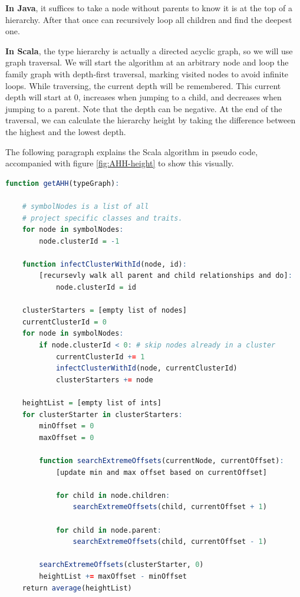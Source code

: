 \documentclass[onecolumn]{article}
\begin{document}
\textbf{In Java}, it suffices to take a node without parents to know it is at the top of a hierarchy. After that once can recursively loop all children and find the deepest one.

\textbf{In Scala}, the type hierarchy is actually a directed acyclic graph, so we will use graph traversal. We will start the algorithm at an arbitrary node and loop the family graph with depth-first traversal, marking visited nodes to avoid infinite loops. While traversing, the current depth will be remembered. This current depth will start at 0, increases when jumping to a child, and decreases when jumping to a parent. Note that the depth can be negative. At the end of the traversal, we can calculate the hierarchy height by taking the difference between the highest and the lowest depth. 

The following paragraph explains the Scala algorithm in pseudo code, accompanied with figure \ref{fig:AHH-height} to show this visually.

\begin{lstlisting}[language=R]
function getAHH(typeGraph):

    # symbolNodes is a list of all 
    # project specific classes and traits.
    for node in symbolNodes: 
        node.clusterId = -1

    function infectClusterWithId(node, id):
        [recursevly walk all parent and child relationships and do]:
            node.clusterId = id

    clusterStarters = [empty list of nodes]
    currentClusterId = 0
    for node in symbolNodes:
        if node.clusterId < 0: # skip nodes already in a cluster
            currentClusterId += 1
            infectClusterWithId(node, currentClusterId)
            clusterStarters += node

    heightList = [empty list of ints]
    for clusterStarter in clusterStarters:
        minOffset = 0
        maxOffset = 0

        function searchExtremeOffsets(currentNode, currentOffset):
            [update min and max offset based on currentOffset]

            for child in node.children:
                searchExtremeOffsets(child, currentOffset + 1)

            for child in node.parent:
                searchExtremeOffsets(child, currentOffset - 1)

        searchExtremeOffsets(clusterStarter, 0)
        heightList += maxOffset - minOffset
    return average(heightList)
\end{lstlisting}
\end{document}
